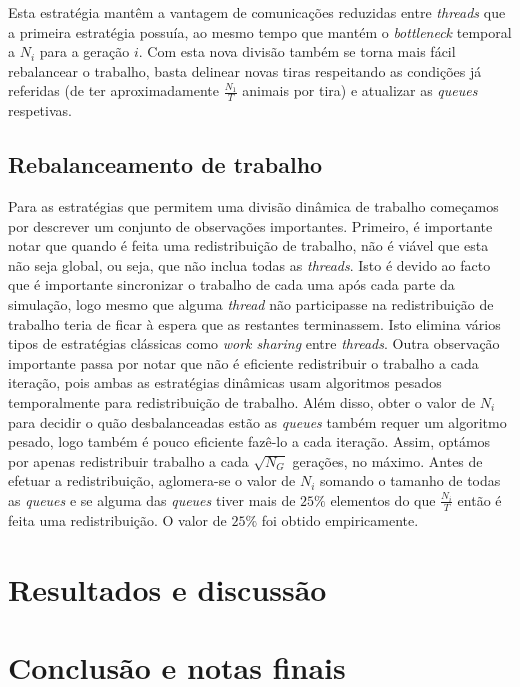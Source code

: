 \documentclass[10pt,a4paper,oneside]{article}
\begin{document}
Esta estratégia mantêm a vantagem de comunicações reduzidas entre
\textit{threads} que a primeira estratégia possuía, ao mesmo tempo que
mantém o \textit{bottleneck} temporal a $N_i$ para a geração $i$. Com
esta nova divisão também se torna mais fácil rebalancear o trabalho,
basta delinear novas tiras respeitando as condições já referidas (de
ter aproximadamente $\frac{N_1}{T}$ animais por tira) e atualizar as
\textit{queues} respetivas.

\subsection{Rebalanceamento de trabalho}
Para as estratégias que permitem uma divisão dinâmica de trabalho
começamos por descrever um conjunto de observações
importantes. Primeiro, é importante notar que quando é feita uma
redistribuição de trabalho, não é viável que esta não seja global, ou
seja, que não inclua todas as \textit{threads}. Isto é devido ao facto
que é importante sincronizar o trabalho de cada uma após cada parte da
simulação, logo mesmo que alguma \textit{thread} não participasse na
redistribuição de trabalho teria de ficar à espera que as restantes
terminassem. Isto elimina vários tipos de estratégias clássicas como
\textit{work sharing} entre \textit{threads}. Outra observação
importante passa por notar que não é eficiente redistribuir o trabalho
a cada iteração, pois ambas as estratégias dinâmicas usam algoritmos
pesados temporalmente para redistribuição de trabalho. Além disso,
obter o valor de $N_i$ para decidir o quão desbalanceadas estão as
\textit{queues} também requer um algoritmo pesado, logo também é pouco
eficiente fazê-lo a cada iteração. Assim, optámos por apenas
redistribuir trabalho a cada $\sqrt{N_G}$ gerações, no máximo. Antes
de efetuar a redistribuição, aglomera-se o valor de $N_i$ somando o
tamanho de todas as \textit{queues} e se alguma das \textit{queues}
tiver mais de $25\%$ elementos do que $\frac{N_i}{T}$ então é feita
uma redistribuição. O valor de $25\%$ foi obtido empiricamente.


\section{Resultados e discussão}
\label{sec:res}



\section{Conclusão e notas finais}
\label{sec:con}

%
%
\end{document}

